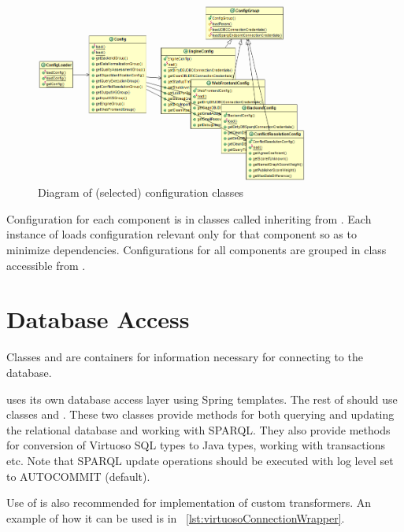 \begin{figure}[htb]
    \centering
    \includegraphics[width=0.8\textwidth]{images/dia-core-config.png}
    \caption{Diagram of (selected) configuration classes}
	\label{fig:configurationClasses}
\end{figure}

Configuration for each component is in classes called  inheriting from . Each instance of  loads configuration relevant only for that component so as to minimize dependencies. Configurations for all components are grouped in  class accessible from .

\section{Database Access}
Classes  and  are containers for information necessary for connecting to the database.

\FE uses its own database access layer using Spring templates. The rest of \odcs should use classes  and . These two classes provide methods for both querying and updating the relational database and working with SPARQL. They also provide methods for conversion of Virtuoso SQL types to Java types, working with transactions etc. Note that SPARQL update operations should be executed with log level set to AUTOCOMMIT (default).

Use of  is also recommended for implementation of custom transformers. An example of how it can be used is in  \lstlistingname~\ref{lst:virtuosoConnectionWrapper}.

